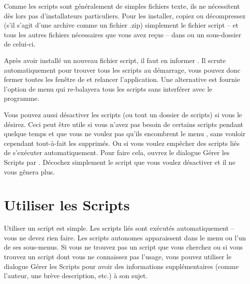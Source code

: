 Comme les scripts sont généralement de simples fichiers texte, ils ne nécessitent dès lors pas d'installateurs particuliers. Pour les installer, copiez ou décompressez (s'il s'agit d'une archive comme un fichier .zip) simplement le fichier script -- et tous les autres fichiers nécessaires que vous avez reçus -- dans  ou un sous-dossier de celui-ci.

Après avoir installé un nouveau fichier script, il faut en informer \Tw{}. Il scrute automatiquement pour trouver tous les scripts au démarrage, vous pouvez donc fermer toutes les fenêtre de \Tw{} et relancer l'application. Une alternative est fournie l'option de menu \submenu{}\submenu{} qui re-balayera tous les scripts sans interférer avec le programme.

Vous pouvez aussi désactiver les scripts (ou tout un dossier de scripts) si vous le désirez. Ceci peut être utile si vous n'avez pas besoin de certains scripts pendant quelque temps et que vous ne voulez pas qu'ils encombrent le menu , sans vouloir cependant tout-à-fait les supprimés. Ou si vous voulez empêcher des scripts liés de s'exécuter automatiquement. Pour faire cela, ouvrez le dialogue \og Gérer les Scripts\fg{} par \submenu{}\submenu{}. Décochez simplement le script que vous voulez désactiver et il ne vous gênera plus.

\section{Utiliser les Scripts}

Utiliser un script est simple. Les scripts liés sont exécutés automatiquement -- vous ne devez rien faire. Les scripts autonomes apparaissent dans le menu  ou l'un de ses sous-menus. Si vous ne trouvez pas un script que vous cherchez ou si vous trouvez un script dont vous ne connaissez pas l'usage, vous pouvez utiliser le dialogue \og Gérer les Scripts\fg{} pour avoir des informations supplémentaires (comme l'auteur, une brève description, etc.) à son sujet.


